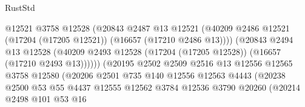 \begin{lexlean}{RustStd}
\begin{coremodule}
                                        @12521
                                        @3758
                                        @12528
                                        (@20843
                                          @2487
                                          @13
                                          @12521
                                          (@40209
                                            @2486
                                            @12521
                                            (@17204 (@17205 @12521))
                                            (@16657 (@17210 @2486 @13))))
                                        (@20843
                                          @2494
                                          @13
                                          @12528
                                          (@40209
                                            @2493
                                            @12528
                                            (@17204 (@17205 @12528))
                                            (@16657 (@17210 @2493 @13))))))
                                    (@20195
                                      @2502
                                      @2509
                                      @2516
                                      @13
                                      @12556
                                      @12565
                                      @3758
                                      @12580
                                      (@20206
                                        @2501
                                        @735
                                        @140
                                        @12556
                                        @12563
                                        @4443
                                        (@20238
                                          @2500
                                          @53
                                          @55
                                          @4437
                                          @12555
                                          @12562
                                          @3784
                                          @12536
                                          @3790
                                          @20260
                                          (@20214
                                            @2498
                                            @101
                                            @53
                                            @16

\end{coremodule}
\end{lexlean}
